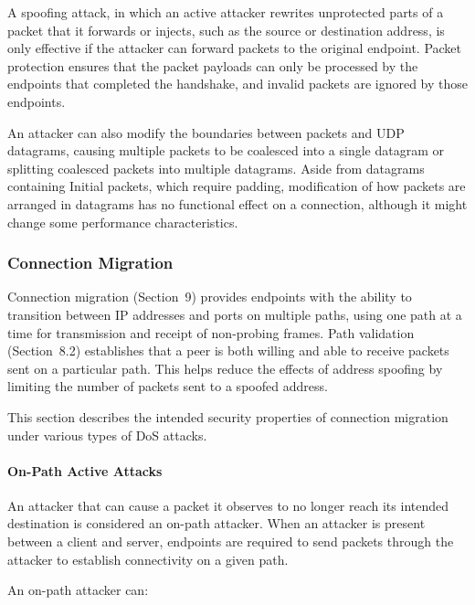 \documentclass{article}
\begin{document}
A spoofing attack, in which an active attacker rewrites unprotected parts of a packet that it forwards or injects, such as the source or destination address, is only effective if the attacker can forward packets to the original endpoint.  Packet protection ensures that the packet payloads can only be processed by the endpoints that completed the handshake, and invalid packets are ignored by those endpoints.

An attacker can also modify the boundaries between packets and UDP datagrams, causing multiple packets to be coalesced into a single datagram or splitting coalesced packets into multiple datagrams. Aside from datagrams containing Initial packets, which require padding, modification of how packets are arranged in datagrams has no functional effect on a connection, although it might change some performance characteristics.

\subsubsection{Connection Migration}

Connection migration (Section~9) provides endpoints with the ability to transition between IP addresses and ports on multiple paths, using one path at a time for transmission and receipt of non-probing frames.  Path validation (Section~8.2) establishes that a peer is both willing and able to receive packets sent on a particular path. This helps reduce the effects of address spoofing by limiting the number of packets sent to a spoofed address.

This section describes the intended security properties of connection migration under various types of DoS attacks.

\paragraph{On-Path Active Attacks}

An attacker that can cause a packet it observes to no longer reach its intended destination is considered an on-path attacker.  When an attacker is present between a client and server, endpoints are required to send packets through the attacker to establish connectivity on a given path.

An on-path attacker can:
\end{document}
